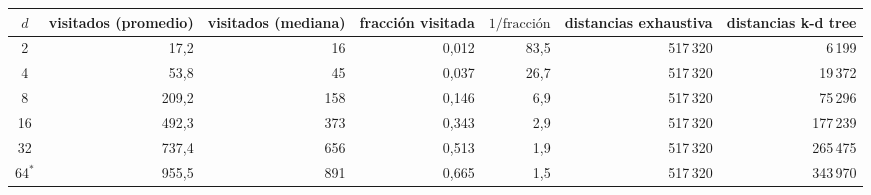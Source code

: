 \begin{tabular}{crrrrrr}
\toprule
$d$ & visitados (promedio) & visitados (mediana) & fracción visitada & $1/\text{fracción}$ & distancias exhaustiva & distancias k-d tree \\
\midrule
2 & 17{,}2 & 16 & 0{,}012 & 83{,}5 & 517\,320 & 6\,199 \\
4 & 53{,}8 & 45 & 0{,}037 & 26{,}7 & 517\,320 & 19\,372 \\
8 & 209{,}2 & 158 & 0{,}146 & 6{,}9 & 517\,320 & 75\,296 \\
16 & 492{,}3 & 373 & 0{,}343 & 2{,}9 & 517\,320 & 177\,239 \\
32 & 737{,}4 & 656 & 0{,}513 & 1{,}9 & 517\,320 & 265\,475 \\
64$^{*}$ & 955{,}5 & 891 & 0{,}665 & 1{,}5 & 517\,320 & 343\,970 \\
\bottomrule
\end{tabular}
